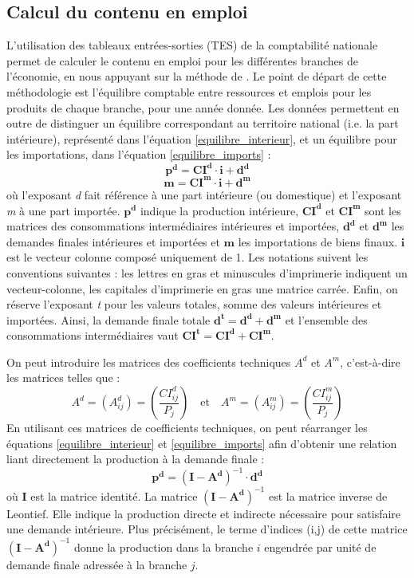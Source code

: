 \subsection{Calcul du contenu en emploi}
L’utilisation des tableaux entrées-sorties (TES) de la comptabilité nationale permet de calculer le contenu en emploi pour les différentes branches de l’économie, en nous appuyant sur la méthode de \citet{Leontief1986}. Le point de départ de cette méthodologie est l’équilibre comptable entre ressources et emplois pour les produits de chaque branche, pour une année donnée. Les données permettent en outre de distinguer un équilibre correspondant au territoire national (i.e. la part intérieure), représenté dans l'équation \ref{equilibre_interieur}, et un équilibre pour les importations, dans l'équation \ref{equilibre_imports} :
\begin{equation}
\pmb{p^d} = \pmb{CI^d} \cdot \pmb{i} + \pmb{d^d}	
\label{equilibre_interieur}
\end{equation}
\begin{equation}
\pmb{m} = \pmb{CI^m} \cdot \pmb{i} + \pmb{d^m}	
\label{equilibre_imports}
\end{equation}
où l'exposant \textit{d} fait référence à une part intérieure (ou domestique) et l'exposant \textit{m} à une part importée. $\pmb{p^d}$ indique la production intérieure, $\pmb{CI^d}$ et $\pmb{CI^m}$ sont les matrices des consommations intermédiaires intérieures et importées, $\pmb{d^d}$ et $\pmb{d^m}$ les demandes finales intérieures et importées et $\pmb{m}$ les importations de biens finaux. $\pmb{i}$ est le vecteur colonne composé uniquement de 1. Les notations suivent les conventions suivantes : les lettres en gras et minuscules d’imprimerie indiquent un vecteur-colonne, les capitales d’imprimerie en gras une matrice carrée. Enfin, on réserve l'exposant \textit{t} pour les valeurs totales, somme des valeurs intérieures et importées. Ainsi, la demande finale totale $\pmb{d^t=d^d+d^m}$ et l'ensemble des consommations intermédiaires vaut $\pmb{CI^t=CI^d+CI^m}$.


On peut introduire les matrices des coefficients techniques $A^d$ et $A^m$, c'est-à-dire les matrices telles que :
\begin{equation*}
A^d = (A^d_{ij}) = \left( \frac{CI^d_{ij}}{P_j} \right) \quad \text{et} \quad A^m = (A^m_{ij}) = \left( \frac{CI^m_{ij}}{P_j} \right)
\end{equation*}
En utilisant ces matrices de coefficients techniques, on peut réarranger les équations \ref{equilibre_interieur} et \ref{equilibre_imports} afin d'obtenir une relation liant directement la production à la demande finale :
\begin{equation}
\pmb{p^d} = (\pmb{I} - \pmb{A^d})^{-1} \cdot \pmb{d^d}	
\label{equilibre_interieur2}
\end{equation}
où $\pmb{I}$ est la matrice identité. La matrice $(\pmb{I} - \pmb{A^d})^{-1}$ est la matrice inverse de Leontief. 
Elle indique la production directe et indirecte nécessaire pour satisfaire une demande intérieure. 
Plus précisément, le terme d'indices (i,j) de cette matrice $(\pmb{I} - \pmb{A^d})^{-1}$ donne la production dans la branche $i$ engendrée par unité de demande finale adressée à la branche $j$.

